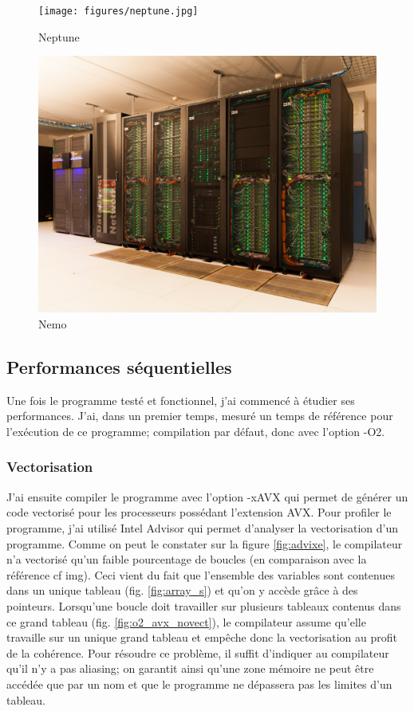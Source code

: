 \begin{figure}[ht]
  \centering
  \begin{minipage}{.5\textwidth}
    \centering
    \texttt{[image: figures/neptune.jpg]}
    \caption{\label{fig:neptune}Neptune}
  \end{minipage}%
  \begin{minipage}{.5\textwidth}
    \centering
    \includegraphics[width=.9\linewidth]{figures/nemo.jpg}
    \caption{\label{fig:neptune_node}Nemo}
  \end{minipage}
\end{figure}



\subsection{Performances séquentielles}
Une fois le programme testé et fonctionnel, j'ai commencé à étudier ses performances. J'ai, dans un premier temps, mesuré un temps de référence pour l'exécution de ce programme; compilation par défaut, donc avec l'option -O2.

\subsubsection{Vectorisation}
J'ai ensuite compiler le programme avec l'option -xAVX qui permet de générer un code vectorisé pour les processeurs possédant l'extension AVX. Pour profiler le programme, j'ai utilisé Intel Advisor qui permet d'analyser la vectorisation d'un programme. Comme on peut le constater sur la figure \ref{fig:advixe}, le compilateur n'a vectorisé qu'un faible pourcentage de boucles (en comparaison avec la référence cf img). Ceci vient du fait que l'ensemble des variables sont contenues dans un unique tableau (fig. \ref{fig:array_s}) et qu'on y accède grâce à des pointeurs. Lorsqu'une boucle doit travailler sur plusieurs tableaux contenus dans ce grand tableau (fig. \ref{fig:o2_avx_novect}), le compilateur assume qu'elle travaille sur un unique grand tableau et empêche donc la vectorisation au profit de la cohérence. Pour résoudre ce problème, il suffit d'indiquer au compilateur qu'il n'y a pas aliasing; on garantit ainsi qu'une zone mémoire ne peut être accédée que par un nom et que le programme ne dépassera pas les limites d'un tableau.


